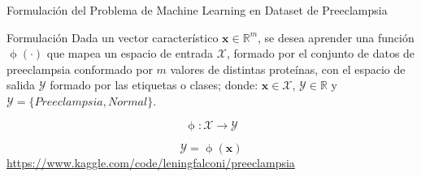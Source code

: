 \documentclass{beamer}
\DeclareMathOperator{\ypred}{\phi}  %
\begin{document}
\begin{frame}{Formulación del Problema de Machine Learning en Dataset de Preeclampsia}
    \begin{block}{Formulación}
    Dada un vector característico $\mathbf{x} \in \mathbb{R}^{m}$, se desea aprender una función $\ypred(\cdot)$ que mapea un espacio de entrada $\mathcal{X}$, formado por el conjunto de datos de preeclampsia conformado por $m$ valores de distintas proteínas, con el espacio de salida $\mathcal{Y}$ formado por las etiquetas o clases; donde: $ \mathbf{x} \in \mathbf{\mathcal{X}}$,  $\mathcal{Y} \in \mathbb{R}$ y $\mathcal{Y} = \{Preeclampsia, Normal\}$. 
    \end{block}
    \begin{equation}
        \ypred: \mathbf{\mathcal{X}} \rightarrow \mathcal{Y}    
    \end{equation}

    \begin{equation}
        \mathcal{Y} = \ypred(\mathbf{x})
    \end{equation}
    \scriptsize
    \url{https://www.kaggle.com/code/leningfalconi/preeclampsia}
\end{frame}

    

\end{document}
